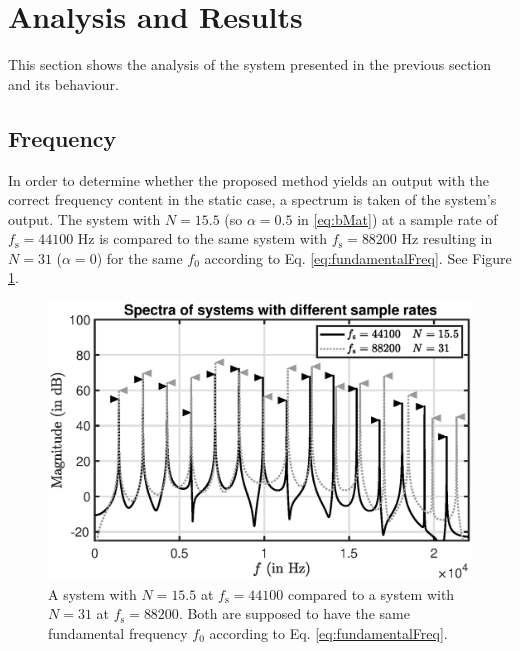 \section{Analysis and Results}\label{sec:results}
This section shows the analysis of the system presented in the previous section and its behaviour.

\subsection{Frequency}
In order to determine whether the proposed method yields an output with the correct frequency content in the static case, a spectrum is taken of the system's output. The system with $N=15.5$ (so $\alpha = 0.5$ in \eqref{eq:bMat}) at a sample rate of $f_\text{s} = 44100$ Hz is compared to the same system with $f_\text{s} = 88200$ Hz resulting in $N=31$ ($\alpha = 0$) for the same $f_0$ according to Eq. \eqref{eq:fundamentalFreq}. See Figure \ref{fig:spectra}.

\begin{figure}[ht]
    \centering
\includegraphics[width=0.8\columnwidth]{Figures/spectraDoubleSampleRateQuadratic.eps}
\caption{\label{fig:spectra}{A system with $N = 15.5$ at $f_\text{s} = 44100$} compared to a system with $N = 31$ at $f_\text{s} = 88200$. Both are supposed to have the same fundamental frequency $f_0$ according to Eq. \eqref{eq:fundamentalFreq}.}
\end{figure} 

